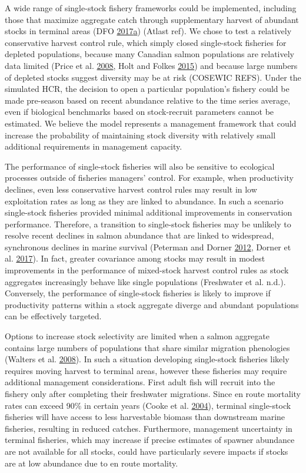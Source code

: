\documentclass[11pt]{book}
\begin{document}
A wide range of single-stock fishery frameworks could be implemented, including those that maximize aggregate catch through supplementary harvest of abundant stocks in terminal areas (DFO \protect\hyperlink{ref-DFO2017a}{2017}\protect\hyperlink{ref-DFO2017a}{a}) (Atlast ref). We chose to test a relatively conservative harvest control rule, which simply closed single-stock fisheries for depleted populations, because many Canadian salmon populations are relatively data limited (Price et al. \protect\hyperlink{ref-Price2008}{2008}, Holt and Folkes \protect\hyperlink{ref-Holt2015}{2015}) and because large numbers of depleted stocks suggest diversity may be at risk (COSEWIC REFS). Under the simulated HCR, the decision to open a particular population's fishery could be made pre-season based on recent abundance relative to the time series average, even if biological benchmarks based on stock-recruit parameters cannot be estimated. We believe the model represents a management framework that could increase the probability of maintaining stock diversity with relatively small additional requirements in management capacity.

The performance of single-stock fisheries will also be sensitive to ecological processes outside of fisheries managers' control. For example, when productivity declines, even less conservative harvest control rules may result in low exploitation rates as long as they are linked to abundance. In such a scenario single-stock fisheries provided minimal additional improvements in conservation performance. Therefore, a transition to single-stock fisheries may be unlikely to resolve recent declines in salmon abundance that are linked to widespread, synchronous declines in marine survival (Peterman and Dorner \protect\hyperlink{ref-Peterman2012}{2012}, Dorner et al. \protect\hyperlink{ref-Dorner2017}{2017}). In fact, greater covariance among stocks may result in modest improvements in the performance of mixed-stock harvest control rules as stock aggregates increasingly behave like single populations (Freshwater et al. n.d.). Conversely, the performance of single-stock fisheries is likely to improve if productivity patterns within a stock aggregate diverge and abundant populations can be effectively targeted.

Options to increase stock selectivity are limited when a salmon aggregate contains large numbers of populations that share similar migration phenologies (Walters et al. \protect\hyperlink{ref-Walters2008}{2008}). In such a situation developing single-stock fisheries likely requires moving harvest to terminal areas, however these fisheries may require additional management considerations. First adult fish will recruit into the fishery only after completing their freshwater migrations. Since en route mortality rates can exceed 90\% in certain years (Cooke et al. \protect\hyperlink{ref-Cooke2004}{2004}), terminal single-stock fisheries will have access to less harvestable biomass than downstream marine fisheries, resulting in reduced catches. Furthermore, management uncertainty in terminal fisheries, which may increase if precise estimates of spawner abundance are not available for all stocks, could have particularly severe impacts if stocks are at low abundance due to en route mortality.
\end{document}
